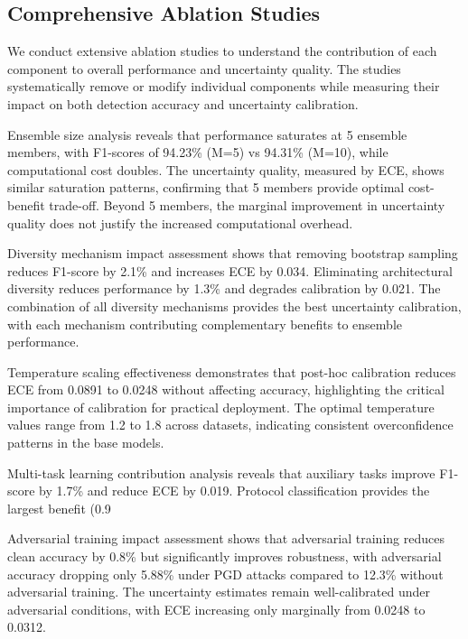 \documentclass[journal]{IEEEtran}
\begin{document}
\subsection{Comprehensive Ablation Studies}

We conduct extensive ablation studies to understand the contribution of each component to overall performance and uncertainty quality. The studies systematically remove or modify individual components while measuring their impact on both detection accuracy and uncertainty calibration.

Ensemble size analysis reveals that performance saturates at 5 ensemble members, with F1-scores of 94.23\% (M=5) vs 94.31\% (M=10), while computational cost doubles. The uncertainty quality, measured by ECE, shows similar saturation patterns, confirming that 5 members provide optimal cost-benefit trade-off. Beyond 5 members, the marginal improvement in uncertainty quality does not justify the increased computational overhead.

Diversity mechanism impact assessment shows that removing bootstrap sampling reduces F1-score by 2.1\% and increases ECE by 0.034. Eliminating architectural diversity reduces performance by 1.3\% and degrades calibration by 0.021. The combination of all diversity mechanisms provides the best uncertainty calibration, with each mechanism contributing complementary benefits to ensemble performance.

Temperature scaling effectiveness demonstrates that post-hoc calibration reduces ECE from 0.0891 to 0.0248 without affecting accuracy, highlighting the critical importance of calibration for practical deployment. The optimal temperature values range from 1.2 to 1.8 across datasets, indicating consistent overconfidence patterns in the base models.

Multi-task learning contribution analysis reveals that auxiliary tasks improve F1-score by 1.7\% and reduce ECE by 0.019. Protocol classification provides the largest benefit (0.9%

Adversarial training impact assessment shows that adversarial training reduces clean accuracy by 0.8\% but significantly improves robustness, with adversarial accuracy dropping only 5.88\% under PGD attacks compared to 12.3\% without adversarial training. The uncertainty estimates remain well-calibrated under adversarial conditions, with ECE increasing only marginally from 0.0248 to 0.0312.
\end{document}
